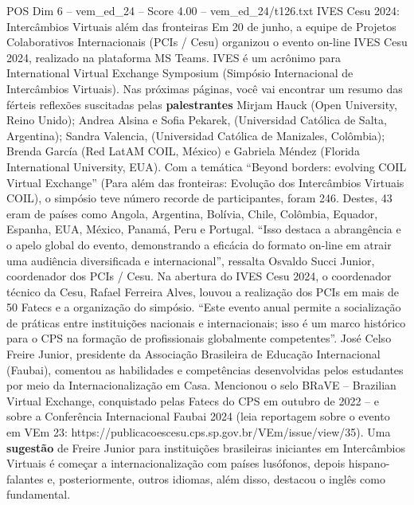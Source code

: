 \begin{textsample}{POS Dim 6 – vem\_ed\_24 – Score 4.00 – vem\_ed\_24/t126.txt}  \label{ex:f6_pos_051}
IVES Cesu 2024: Intercâmbios Virtuais além das fronteiras Em 20 de junho, a equipe de Projetos Colaborativos Internacionais (PCIs / Cesu) organizou o evento on-line IVES Cesu 2024, realizado na plataforma MS Teams.
IVES é um acrônimo para International Virtual Exchange Symposium (Simpósio Internacional de Intercâmbios Virtuais).
Nas próximas páginas, você vai encontrar um resumo das férteis reflexões suscitadas pelas \textbf{palestrantes} Mirjam Hauck (Open University, Reino Unido); Andrea Alsina e Sofia Pekarek, (Universidad Católica de Salta, Argentina); Sandra Valencia, (Universidad Católica de Manizales, Colômbia); Brenda García (Red LatAM COIL, México) e Gabriela Méndez (Florida International University, EUA).
Com a temática “Beyond borders: evolving COIL Virtual Exchange” (Para além das fronteiras: Evolução dos Intercâmbios Virtuais COIL), o simpósio teve número recorde de participantes, foram 246.
Destes, 43 eram de países como Angola, Argentina, Bolívia, Chile, Colômbia, Equador, Espanha, EUA, México, Panamá, Peru e Portugal. “Isso destaca a abrangência e o apelo global do evento, demonstrando a eficácia do formato on-line em atrair uma audiência diversificada e internacional”, ressalta Osvaldo Succi Junior, coordenador dos PCIs / Cesu.
Na abertura do IVES Cesu 2024, o coordenador técnico da Cesu, Rafael Ferreira Alves, louvou a realização dos PCIs em mais de 50 Fatecs e a organização do simpósio. “Este evento anual permite a socialização de práticas entre instituições nacionais e internacionais; isso é um marco histórico para o CPS na formação de profissionais globalmente competentes”.
José Celso Freire Junior, presidente da Associação Brasileira de Educação Internacional (Faubai), comentou as habilidades e competências desenvolvidas pelos estudantes por meio da Internacionalização em Casa.
Mencionou o selo BRaVE – Brazilian Virtual Exchange, conquistado pelas Fatecs do CPS em outubro de 2022 – e sobre a Conferência Internacional Faubai 2024 (leia reportagem sobre o evento em VEm 23: https://publicacoescesu.cps.sp.gov.br/VEm/issue/view/35).
Uma \textbf{sugestão} de Freire Junior para instituições brasileiras iniciantes em Intercâmbios Virtuais é começar a internacionalização com países lusófonos, depois hispano-falantes e, posteriormente, outros idiomas, além disso, destacou o inglês como fundamental.

\end{textsample}
